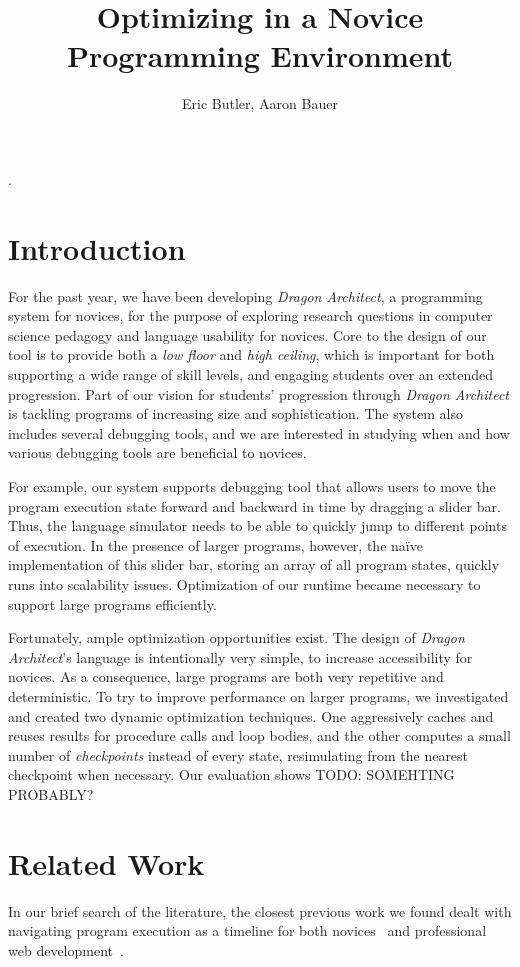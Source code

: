 \documentclass{sig-alternate}
\newcommand{\da}{\emph{Dragon Architect}}
\newcommand{\todo}[1]{{\color{red} TODO: #1}}
\begin{document}
\title{Optimizing in a Novice Programming Environment}
\author{Eric Butler, Aaron Bauer}
\maketitle{}.

\section{Introduction}

For the past year, we have been developing \da, a programming system for novices, for the purpose of exploring research questions in computer science pedagogy and language usability for novices. Core to the design of our tool is to provide both a \emph{low floor} and \emph{high ceiling}, which is important for both supporting a wide range of skill levels, and engaging students over an extended progression. Part of our vision for students' progression through \da{} is tackling programs of increasing size and sophistication. The system also includes several debugging tools, and we are interested in studying when and how various debugging tools are beneficial to novices. 

For example, our system supports debugging tool that allows users to move the program execution state forward and backward in time by dragging a slider bar. Thus, the language simulator needs to be able to quickly jump to different points of execution. In the presence of larger programs, however, the na\"{i}ve implementation of this slider bar, storing an array of all program states, quickly runs into scalability issues. Optimization of our runtime became necessary to support large programs efficiently. 

Fortunately, ample optimization opportunities exist. The design of \da{}'s language is intentionally very simple, to increase accessibility for novices. As a consequence, large programs are both very repetitive and deterministic. To try to improve performance on larger programs, we investigated and created two dynamic optimization techniques. One aggressively caches and reuses results for procedure calls and loop bodies, and the other computes a small number of \emph{checkpoints} instead of every state, resimulating from the nearest checkpoint when necessary. Our evaluation shows \todo{SOMEHTING PROBABLY?}

\section{Related Work}
In our brief search of the literature, the closest previous work we found dealt with navigating program execution as a timeline for both novices~\cite{ko2004designing} and professional web development~\cite{burg2013interactive}.
\end{document}
